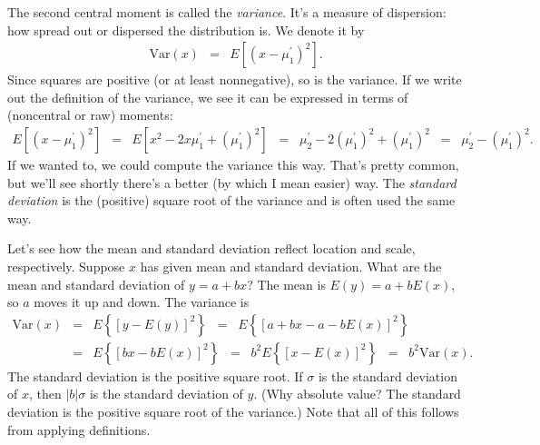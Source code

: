 \documentclass[11pt]{article}
\begin{document}
The second central moment is called the {\it variance\/}.
It's a measure of dispersion:  how spread out or dispersed the distribution is.
We denote it by
\begin{eqnarray*}
    \mbox{Var}(x)  &=&  E [(x-\mu_1^\prime)^2] .
\end{eqnarray*}
Since squares are positive (or at least nonnegative), so is the variance.
If we write out the definition of the variance,
we see it can be expressed in terms of (noncentral or raw) moments:
\begin{eqnarray*}
    E [(x-\mu_1^\prime)^2]  &=&  E [x^2 - 2 x\mu_1^\prime + (\mu_1^\prime)^2]
            \;\;=\;\; \mu_2^\prime - 2 (\mu_1^\prime)^2 + (\mu_1^\prime)^2
            \;\;=\;\; \mu_2^\prime -  (\mu_1^\prime)^2 .
\end{eqnarray*}
If we wanted to, we could compute the variance this way.
That's pretty common, but we'll see shortly there's a
better (by which I mean easier) way.
The {\it standard deviation\/} is the (positive) square root of the variance
and is often used the same way.

Let's see how the mean and standard deviation reflect
location and scale, respectively.
Suppose $x$ has given mean and standard deviation.
What are the mean and standard deviation of $y = a + b x$?
The mean is $ E(y) = a + b E(x)$,
so $a$ moves it up and down.
The variance is
\begin{eqnarray*}
    \mbox{Var}(x) &=& E \left\{ [y - E(y)]^2 \right\}
        \;\;=\;\; E \left\{ [a + b x - a - b E(x)]^2 \right\} \\
        &=& E \left\{  [ b x - b E(x)]^2 \right\}
        \;\;=\;\; b^2 E \left\{ [ x - E(x)]^2 \right\}
        \;\;=\;\; b^2 \mbox{Var}(x) .
\end{eqnarray*}
The standard deviation is the positive square root.
If $\sigma$ is the standard deviation of $x$,
then $|b| \sigma$ is the standard deviation of $y$.
(Why absolute value?  The standard deviation is the positive square root of the variance.)
Note that all of this follows from applying definitions.

\end{document}
